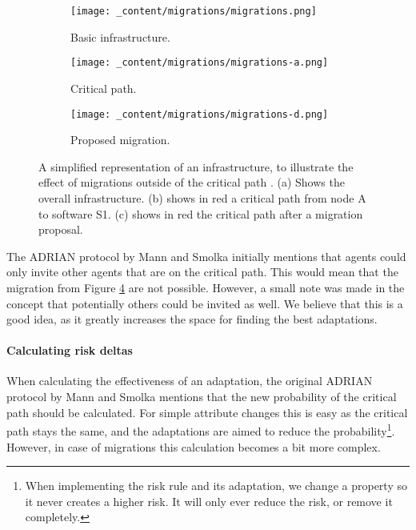 \begin{figure}[H]
    \begin{subfigure}[b]{0.3\textwidth}
        \centering
        \texttt{[image: \_content/migrations/migrations.png]}
        \caption{Basic infrastructure.}
        \label{fig:migrations-outside-infrastructure}
    \end{subfigure}
    \begin{subfigure}[b]{0.3\textwidth}
        \centering
        \texttt{[image: \_content/migrations/migrations-a.png]}
        \caption{Critical path.}
        \label{fig:migrations-outside-attack}
    \end{subfigure}
    \begin{subfigure}[b]{0.3\textwidth}
        \centering
        \texttt{[image: \_content/migrations/migrations-d.png]}
        \caption{Proposed migration.}
        \label{fig:migrations-outside-proposal}
    \end{subfigure}
    \caption{A simplified representation of an infrastructure, to illustrate the effect of migrations outside of the critical path . (a) Shows the overall infrastructure. (b) shows in red a critical path from node A to software S1. (c) shows in red the critical path after a migration proposal.}
    \label{fig:migrations-outside}
\end{figure}

The ADRIAN protocol by Mann and Smolka \cite{mann2023ADRIAN} initially mentions that agents could only invite other agents that are on the critical path. This would mean that the migration from Figure \ref{fig:migrations-outside} are not possible. However, a small note was made in the concept that potentially others could be invited as well. We believe that this is a good idea, as it greatly increases the space for finding the best adaptations. 

\paragraph*{Calculating risk deltas}
\label{ssec:risk-deltas}
When calculating the effectiveness of an adaptation, the original ADRIAN protocol by Mann and Smolka \cite{mann2023ADRIAN} mentions that the new probability of the critical path should be calculated. For simple attribute changes this is easy as the critical path stays the same, and the adaptations are aimed to reduce the probability\footnote{When implementing the risk rule and its adaptation, we change a property so it never creates a higher risk. It will only ever reduce the risk, or remove it completely.}. However, in case of migrations this calculation becomes a bit more complex. 

